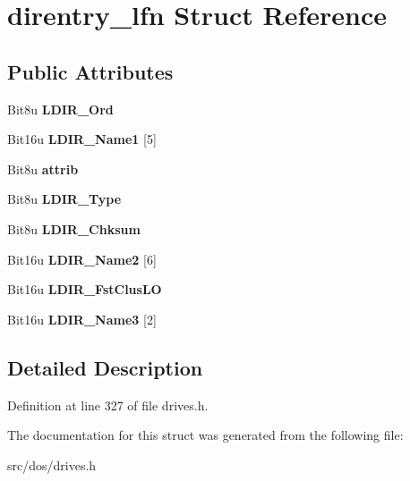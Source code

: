 \hypertarget{structdirentry__lfn}{\section{direntry\-\_\-lfn Struct Reference}
\label{structdirentry__lfn}
}
\subsection*{Public Attributes}
\begin{DoxyCompactItemize}
\item 
\hypertarget{structdirentry__lfn_aaab8a3f28303fc4f4a77fc5cd65c7be8}{Bit8u {\bfseries L\-D\-I\-R\-\_\-\-Ord}}\label{structdirentry__lfn_aaab8a3f28303fc4f4a77fc5cd65c7be8}

\item 
\hypertarget{structdirentry__lfn_a2adf1b9f1c295543b457922ac64e78e3}{Bit16u {\bfseries L\-D\-I\-R\-\_\-\-Name1} \mbox{[}5\mbox{]}}\label{structdirentry__lfn_a2adf1b9f1c295543b457922ac64e78e3}

\item 
\hypertarget{structdirentry__lfn_a68cdb631a2305c8e0541242997fa8bf2}{Bit8u {\bfseries attrib}}\label{structdirentry__lfn_a68cdb631a2305c8e0541242997fa8bf2}

\item 
\hypertarget{structdirentry__lfn_a3d4f26b1312ce7cd79ffd0174f4efb4c}{Bit8u {\bfseries L\-D\-I\-R\-\_\-\-Type}}\label{structdirentry__lfn_a3d4f26b1312ce7cd79ffd0174f4efb4c}

\item 
\hypertarget{structdirentry__lfn_aa6eb55c9590355eb0d5474cbb8a74d5f}{Bit8u {\bfseries L\-D\-I\-R\-\_\-\-Chksum}}\label{structdirentry__lfn_aa6eb55c9590355eb0d5474cbb8a74d5f}

\item 
\hypertarget{structdirentry__lfn_a94951206429fe59d5614f6b535c6a013}{Bit16u {\bfseries L\-D\-I\-R\-\_\-\-Name2} \mbox{[}6\mbox{]}}\label{structdirentry__lfn_a94951206429fe59d5614f6b535c6a013}

\item 
\hypertarget{structdirentry__lfn_a08ddfdfd52183a362fb28291d43c69a5}{Bit16u {\bfseries L\-D\-I\-R\-\_\-\-Fst\-Clus\-L\-O}}\label{structdirentry__lfn_a08ddfdfd52183a362fb28291d43c69a5}

\item 
\hypertarget{structdirentry__lfn_a77e612b228b3545b8dd73d18e9409b75}{Bit16u {\bfseries L\-D\-I\-R\-\_\-\-Name3} \mbox{[}2\mbox{]}}\label{structdirentry__lfn_a77e612b228b3545b8dd73d18e9409b75}

\end{DoxyCompactItemize}


\subsection{Detailed Description}


Definition at line 327 of file drives.\-h.



The documentation for this struct was generated from the following file\-:\begin{DoxyCompactItemize}
\item 
src/dos/drives.\-h\end{DoxyCompactItemize}
